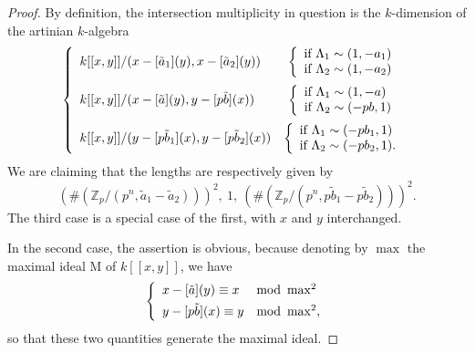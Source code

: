 \begin{proof}
By definition, the intersection multiplicity in question is the $k$-dimension of the artinian $k$-algebra
\[
\left\{\begin{array}{l@{\quad}c}
k[[x,y]]/(x - [\tilde a_1](y), x - [\tilde a_2](y)) &
\left\{\begin{array}{l}\text{if } \Lambda_1 \sim (1, -a_1) \\ \text{if } \Lambda_2 \sim (1, -a_2)\end{array}\right. \\[12pt]
k[[x,y]]/(x - [\tilde a](y), y - [p\tilde b](x)) &
\left\{\begin{array}{l}\text{if } \Lambda_1 \sim (1, -a) \\ \text{if } \Lambda_2 \sim (-pb, 1)\end{array}\right. \\[12pt]
k[[x,y]]/(y - [p\tilde b_1](x), y - [p\tilde b_2](x)) &
\left\{\begin{array}{l}\text{if } \Lambda_1 \sim (-pb_1, 1) \\ \text{if } \Lambda_2 \sim (-pb_2, 1) .\end{array}\right.
\end{array}\right.
\]
We are claiming that the lengths are respectively given by
\[
(\#(\mathbb{Z}_p/(p^n, \tilde a_1 - \tilde a_2)))^2 , \ 1 , \ (\#(\mathbb{Z}_p/(p^n, p\tilde b_1 - p\tilde b_2)))^2 .
\]
The third case is a special case of the first, with $x$ and $y$ interchanged.

In the second case, the assertion is obvious, because denoting by $\max$ the maximal ideal $\mathrm{M}$ of $k[[x,y]]$, we have
\[
\left\{\begin{array}{l@{\quad}l}
x - [\tilde a](y) \equiv x & \mathrm{mod}\ \max^2 \\[4pt]
y - [p\tilde b](x) \equiv y & \mathrm{mod}\ \max^2 ,
\end{array}\right.
\]
so that these two quantities generate the maximal ideal.


\end{proof}
